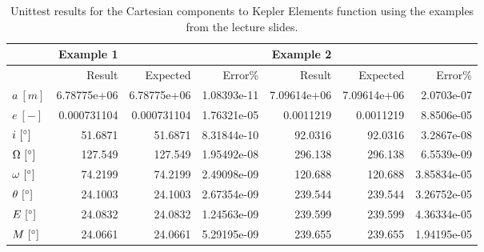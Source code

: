     \begin{table}[h!] \centering
        \begin{tabular}{l||rrr|rrr}
                                & Example 1     &               &              & Example 2     \\
            \hline \hline
                                &        Result &      Expected &     Error\%  &        Result &      Expected &     Error\% \\
            \hline 
            $a\ [m]$            &   6.78775e+06 &   6.78775e+06 & 1.08393e-11  &   7.09614e+06 &   7.09614e+06 & 2.0703e-07  \\
            $e\ [-]$            &   0.000731104 &   0.000731104 & 1.76321e-05  &   0.0011219   &   0.0011219   & 8.8506e-05  \\
            $i\ [\degree]$      &  51.6871      &  51.6871      & 8.31844e-10  &  92.0316      &  92.0316      & 3.2867e-08  \\
            $\Omega\ [\degree]$ & 127.549       & 127.549       & 1.95492e-08  & 296.138       & 296.138       & 6.5539e-09  \\
            $\omega\ [\degree]$ &  74.2199      &  74.2199      & 2.49098e-09  & 120.688       & 120.688       & 3.85834e-05 \\
            $\theta\ [\degree]$ &  24.1003      &  24.1003      & 2.67354e-09  & 239.544       & 239.544       & 3.26752e-05 \\
            $E\ [\degree]$      &  24.0832      &  24.0832      & 1.24563e-09  & 239.599       & 239.599       & 4.36334e-05 \\
            $M\ [\degree]$      &  24.0661      &  24.0661      & 5.29195e-09  & 239.655       & 239.655       & 1.94195e-05 \\
            \hline
        \end{tabular}
        \caption{Unittest results for the Cartesian components to Kepler Elements function using the examples from the lecture slides.}
        \label{tab:cctkeut}
    \end{table}

